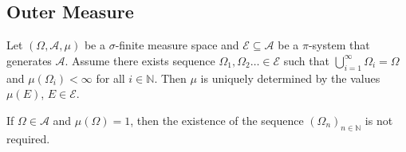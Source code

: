 \subsection{Outer Measure}

\begin{lemma}
\label{uniquely defined by base pi sys}
    Let $(\Omega,\mathcal{A},\mu)$ be a $\sigma$-finite measure space and $\mathcal{E}\subseteq\mathcal{A}$ be a $\pi$-system that generates $\mathcal{A}$. Assume there exists sequence $\Omega_1,\Omega_2\ldots\in\mathcal{E}$ such that $\bigcup_{i=1}^\infty\Omega_i=\Omega$ and $\mu(\Omega_i)<\infty$ for all $i\in\mathbb{N}$. Then $\mu$ is uniquely determined by the values $\mu(E)$, $E\in\mathcal{E}$.
    
    If $\Omega\in\mathcal{A}$ and $\mu(\Omega)=1$, then the existence of the sequence $(\Omega_n)_{n\in\mathbb{N}}$ is not required.
\end{lemma}
